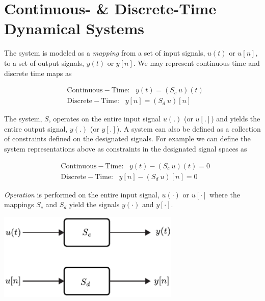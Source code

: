\documentclass[twoside]{article}
\begin{document}
\newpage

\section{Continuous- \& Discrete-Time Dynamical Systems} 

The system is modeled as a \textit{mapping} from a set of input
signals, $u(t)$ or $u[n]$, to a set of output signals, $y(t)$ or $y[n]$.
We may represent continuous time and discrete time maps as

\begin{align*}
  &\mathrm{Continuous-Time}: \ \ \ y(t) = (S_c \ u) (t) \\
  &\mathrm{Discrete-Time}: \ \ \ y[n] = (S_d \ u) [n] 
\end{align*}

The system, $S$, operates on the entire input signal $u(.)$ (or $u[.]$) and yields the
entire output signal, $y(.)$ (or $y[.]$). A system can also be defined
as a collection of constraints defined on the designated signals. For
example we can define the system representations above as constraints
in the designated signal spaces as

\begin{align*}
  &\mathrm{Continuous-Time}: \ \ \ y(t) - (S_c \ u) (t) = 0 \\
  &\mathrm{Discrete-Time}: \ \ \ y[n] - (S_d \ u) [n] = 0
\end{align*}   

\vspace{6pt}

\textit{Operation} is performed on the entire input signal, $u(\cdot)$ or
$u[\cdot]$ where the mappings $S_c$ and $S_d$ yield the signals
$y(\cdot)$ and $y[\cdot]$. 

\vspace{12pt}

    \begin{center}
  \begin{minipage}[h]{0.9\linewidth}
    \begin{center}
      \includegraphics[width=0.65\textwidth]{blocks}
    \end{center}
  \end{minipage}
    \end{center}
\end{document}
